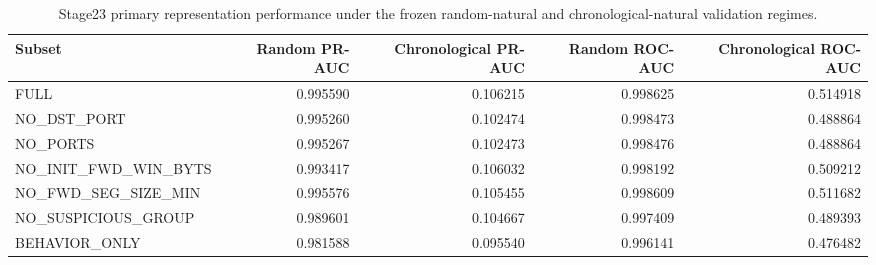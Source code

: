 \begin{table}[t]
\centering
\caption{Stage23 primary representation performance under the frozen random-natural and chronological-natural validation regimes.}
\label{tab:stage23-primary}
\small
\begin{tabular}{lrrrr}
\hline
Subset & Random PR-AUC & Chronological PR-AUC & Random ROC-AUC & Chronological ROC-AUC \\
\hline
FULL & 0.995590 & 0.106215 & 0.998625 & 0.514918 \\
NO\_DST\_PORT & 0.995260 & 0.102474 & 0.998473 & 0.488864 \\
NO\_PORTS & 0.995267 & 0.102473 & 0.998476 & 0.488864 \\
NO\_INIT\_FWD\_WIN\_BYTS & 0.993417 & 0.106032 & 0.998192 & 0.509212 \\
NO\_FWD\_SEG\_SIZE\_MIN & 0.995576 & 0.105455 & 0.998609 & 0.511682 \\
NO\_SUSPICIOUS\_GROUP & 0.989601 & 0.104667 & 0.997409 & 0.489393 \\
BEHAVIOR\_ONLY & 0.981588 & 0.095540 & 0.996141 & 0.476482 \\
\hline
\end{tabular}
\end{table}

